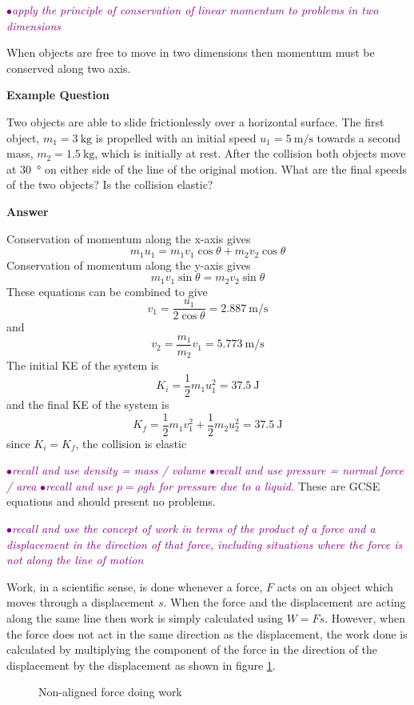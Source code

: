 \documentclass[a4paper,11pt,twoside]{memoir}
\newcounter{spec}[chapter]
\newcommand{\spec}[1]{\Needspace{5\baselineskip}\textcolor{purple}{$\bullet$\hspace{0.5cm}\textit{#1}}}
\newcommand{\answer}{\par \textbf{Answer} \par}
\newenvironment{example}
{\begin{lrbox}{\examplebox}\begin{minipage}{0.9\textwidth}\textbf{Example Question}\par}
{\end{minipage}\end{lrbox}\fbox{\usebox{\examplebox}}}
\begin{document}
\spec{apply the principle of conservation of linear momentum to problems in two dimensions}

When objects are free to move in two dimensions then momentum must be conserved along two axis.

\begin{example}
	Two objects are able to slide frictionlessly over a horizontal surface. The first object, $m_1=\SI{3}{\kg}$ is propelled with an initial speed $u_1=\SI{5}{\m\per\s}$ towards a second mass, $m_2=\SI{1.5}{\kg}$, which is initially at rest. After the collision both objects move at \SI{30}{\degree} on either side of the line of the original motion. What are the final speeds of the two objects? Is the collision elastic?
	\answer
	Conservation of momentum along the x-axis gives
	$$ m_1u_1 = m_1v_1\cos{\theta} + m_2v_2\cos{\theta}$$
	Conservation of momentum along the y-axis gives
	$$ m_1v_1\sin{\theta} = m_2v_2\sin{\theta} $$
	These equations can be combined to give
	$$ v_1 = \frac{u_1}{2\cos{\theta}} = \SI{2.887}{\m\per\s}$$
	and
	$$ v_2 = \frac{m_1}{m_2}v_1= \SI{5.773}{\m\per\s}$$
	The initial KE of the system is
	$$ K_i = \frac{1}{2}m_1u_1^2 = \SI{37.5}{\joule} $$
	and the final KE of the system is
	$$ K_f = \frac{1}{2}m_1v_1^2 + \frac{1}{2}m_2u_2^2 = \SI{37.5}{\joule}$$
	since $K_i = K_f$, the collision is elastic
\end{example}

\spec{recall and use density = mass / volume}
\spec{recall and use pressure = normal force / area}
\spec{recall and use $ p = \rho gh $ for pressure due to a liquid.}
These are GCSE equations and should present no problems.

\spec{recall and use the concept of work in terms of the product of a force and a displacement in the direction of that force, including situations where the force is not along the line of motion}

Work, in a scientific sense, is done whenever a force, $F$ acts on an object which moves through a displacement $s$. When the force and the displacement are acting along the same line then work is simply calculated using $W=Fs$. However, when the force does not act in the same direction as the displacement, the work done is calculated by multiplying the component of the force in the direction of the displacement by the displacement as shown in figure \ref{work}.

\begin{figure}[h]
  \begin{center}
  \end{center}
  \caption{Non-aligned force doing work}
  \label{work}
\end{figure}
\end{document}
